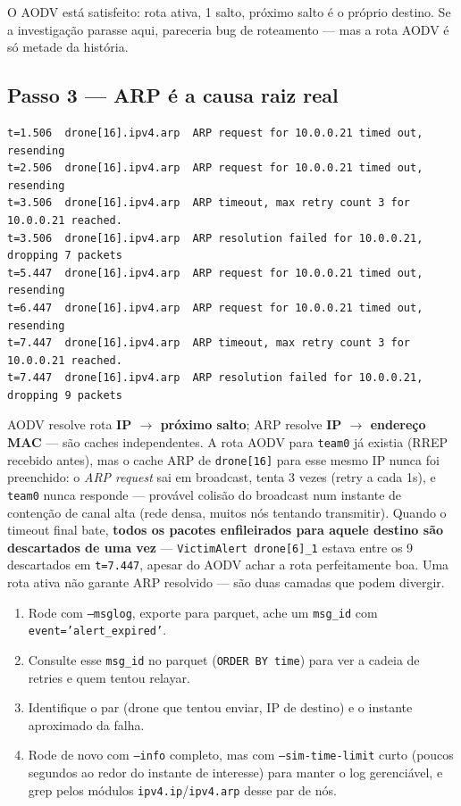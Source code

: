 \documentclass[11pt,a4paper]{article}
\begin{document}
O AODV está satisfeito: rota ativa, 1 salto, próximo salto é o próprio
destino. Se a investigação parasse aqui, pareceria bug de roteamento ---
mas a rota AODV é só metade da história.

\subsection{Passo 3 --- ARP é a causa raiz real}

\begin{lstlisting}[style=simlog]
t=1.506  drone[16].ipv4.arp  ARP request for 10.0.0.21 timed out, resending
t=2.506  drone[16].ipv4.arp  ARP request for 10.0.0.21 timed out, resending
t=3.506  drone[16].ipv4.arp  ARP timeout, max retry count 3 for 10.0.0.21 reached.
t=3.506  drone[16].ipv4.arp  ARP resolution failed for 10.0.0.21,  dropping 7 packets
t=5.447  drone[16].ipv4.arp  ARP request for 10.0.0.21 timed out, resending
t=6.447  drone[16].ipv4.arp  ARP request for 10.0.0.21 timed out, resending
t=7.447  drone[16].ipv4.arp  ARP timeout, max retry count 3 for 10.0.0.21 reached.
t=7.447  drone[16].ipv4.arp  ARP resolution failed for 10.0.0.21,  dropping 9 packets
\end{lstlisting}

\begin{explica}
AODV resolve rota \textbf{IP $\to$ próximo salto}; ARP resolve
\textbf{IP $\to$ endereço MAC} --- são caches independentes. A rota AODV
para \texttt{team0} já existia (RREP recebido antes), mas o cache ARP de
\texttt{drone[16]} para esse mesmo IP nunca foi preenchido: o \emph{ARP
request} sai em broadcast, tenta 3 vezes (retry a cada 1s), e
\texttt{team0} nunca responde --- provável colisão do broadcast num
instante de contenção de canal alta (rede densa, muitos nós tentando
transmitir). Quando o timeout final bate, \textbf{todos os pacotes
enfileirados para aquele destino são descartados de uma vez} ---
\texttt{VictimAlert drone[6]\_1} estava entre os 9 descartados em
\texttt{t=7.447}, apesar do AODV achar a rota perfeitamente boa. Uma rota
ativa não garante ARP resolvido --- são duas camadas que podem divergir.
\end{explica}

\begin{explica}
\begin{enumerate}[leftmargin=1.3em, itemsep=2pt]
\item Rode com \texttt{--msglog}, exporte para parquet, ache um
\texttt{msg\_id} com \texttt{event='alert\_expired'}.
\item Consulte esse \texttt{msg\_id} no parquet (\texttt{ORDER BY time}) para
ver a cadeia de retries e quem tentou relayar.
\item Identifique o par (drone que tentou enviar, IP de destino) e o
instante aproximado da falha.
\item Rode de novo com \texttt{--info} completo, mas com
\texttt{--sim-time-limit} curto (poucos segundos ao redor do instante de
interesse) para manter o log gerenciável, e grep pelos módulos
\texttt{ipv4.ip}/\texttt{ipv4.arp} desse par de nós.
\end{enumerate}
\end{explica}
\end{document}
